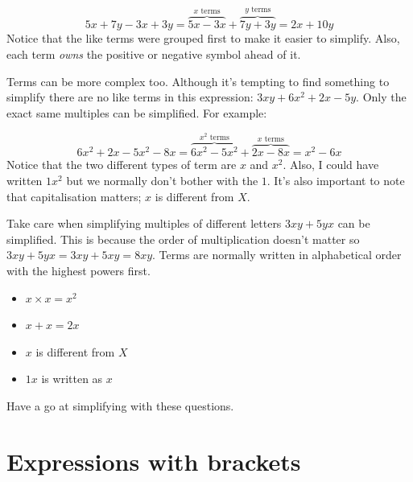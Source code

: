 \documentclass[
  a4paper,
]{scrbook}
\providecommand{\tightlist}{%
  \setlength{\itemsep}{0pt}\setlength{\parskip}{0pt}}
\begin{document}
\[
5x + 7y - 3x + 3y = \overbrace{5x - 3x}^{x\text{ terms}} + \overbrace{7y + 3y}^{y\text{ terms}} = 2x + 10y
\] Notice that the like terms were grouped first to make it easier to
simplify. Also, each term \emph{owns} the positive or negative symbol
ahead of it.

Terms can be more complex too. Although it's tempting to find something
to simplify there are no like terms in this expression:
\(3xy + 6x^2 + 2x - 5y\). Only the exact same multiples can be
simplified. For example:

\[
6x^2 + 2x - 5x^2 -8x = \overbrace{6x^2 -5x^2}^{x^2\text{ terms}} + \overbrace{2x-8x}^{x\text{ terms}}=x^2-6x
\] Notice that the two different types of term are \(x\) and \(x^2\).
Also, I could have written \(1x^2\) but we normally don't bother with
the \(1\). It's also important to note that capitalisation matters;
\(x\) is different from \(X\).

Take care when simplifying multiples of different letters \(3xy + 5yx\)
can be simplified. This is because the order of multiplication doesn't
matter so \(3xy + 5yx = 3xy + 5xy = 8xy\). Terms are normally written in
alphabetical order with the highest powers first.

\begin{tcolorbox}[enhanced jigsaw, arc=.35mm, bottomrule=.15mm, bottomtitle=1mm, breakable, colback=white, colbacktitle=quarto-callout-note-color!10!white, colframe=quarto-callout-note-color-frame, coltitle=black, left=2mm, leftrule=.75mm, opacityback=0, opacitybacktitle=0.6, rightrule=.15mm, title=\textcolor{quarto-callout-note-color}{\faInfo}\hspace{0.5em}{Key point:}, titlerule=0mm, toprule=.15mm, toptitle=1mm]

\begin{itemize}
\tightlist
\item
  \(x \times x = x^2\)
\item
  \(x + x = 2x\)
\item
  \(x\) is different from \(X\)
\item
  \(1x\) is written as \(x\)
\end{itemize}

\end{tcolorbox}

Have a go at simplifying with these questions.


\chapter{Expressions with brackets}\label{expressions-with-brackets}
\end{document}
